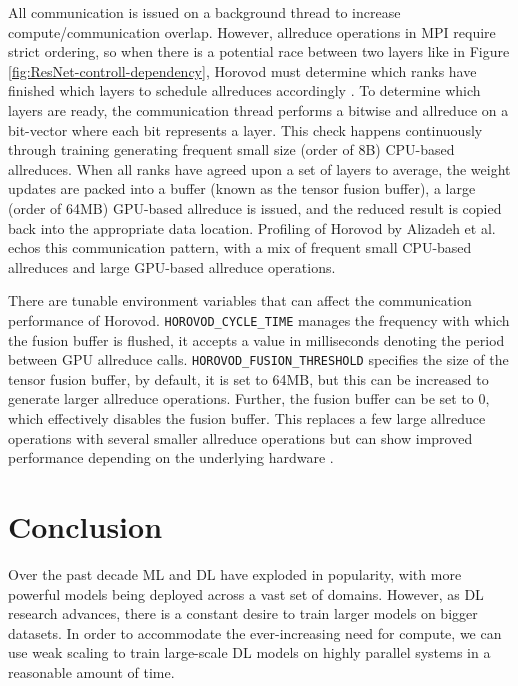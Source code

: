 All communication is issued on a background thread to increase compute/communication overlap.
However, allreduce operations in \gls{MPI} require strict ordering, so when there is a potential race between two layers like in Figure \ref{fig:ResNet-controll-dependency}, Horovod must determine which ranks have finished which layers to schedule allreduces accordingly \cite{Kurth2019TFatScaleAnalysisOfHvdAndCPEML}.  
To determine which layers are ready, the communication thread performs a bitwise and allreduce on a bit-vector where each bit represents a layer.
This check happens continuously through training generating frequent small size (order of 8B) \gls{CPU}-based allreduces.
When all ranks have agreed upon a set of layers to average, the weight updates are packed into a buffer (known as the tensor fusion buffer), a large (order of 64MB) \gls{GPU}-based allreduce is issued, and the reduced result is copied back into the appropriate data location.
Profiling of Horovod by Alizadeh et al. \cite{Alizadeh2022PAPCollDL} echos this communication pattern, with a mix of frequent small \gls{CPU}-based allreduces and large \gls{GPU}-based allreduce operations.



There are tunable environment variables that can affect the communication performance of Horovod.
\texttt{HOROVOD\_CYCLE\_TIME} manages the frequency with which the fusion buffer is flushed, it accepts a value in milliseconds denoting the period between \gls{GPU} allreduce calls.
\texttt{HOROVOD\_FUSION\_THRESHOLD} specifies the size of the tensor fusion buffer, by default, it is set to 64MB, but this can be increased to generate larger allreduce operations.
Further, the fusion buffer can be set to 0, which effectively disables the fusion buffer.
This replaces a few large allreduce operations with several smaller allreduce operations but can show improved performance depending on the underlying hardware \cite{Awan2019CommProfDLonClusters}.

\section{Conclusion}
Over the past decade \gls{ML} and \gls{DL} have exploded in popularity, with more powerful models being deployed across a vast set of domains.  
However, as \gls{DL} research advances, there is a constant desire to train larger models on bigger datasets.
In order to accommodate the ever-increasing need for compute, we can use weak scaling to train large-scale \gls{DL} models on highly parallel systems in a reasonable amount of time.

